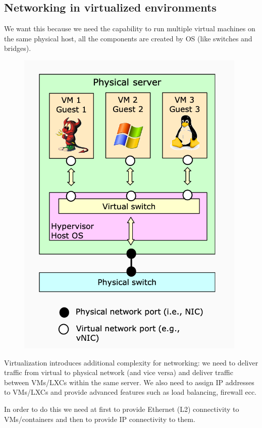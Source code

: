     \subsection{Networking in virtualized environments}
    We want this because we need the capability to run multiple virtual machines on the same physical host, all the components are created by OS (like switches and bridges).
    \begin{figure}[h!]
        \centering
        \includegraphics[scale=0.25]{images/virtualnet.png}
    \end{figure}    
    Virtualization introduces additional complexity for networking: we need to deliver traffic from virtual to physical network (and vice versa) and deliver traffic between VMs/LXCs within the same server. We also need to assign IP addresses to VMs/LXCs and provide advanced features such as load balancing, firewall ecc.
    
    In order to do this we need at first to provide Ethernet (L2) connectivity to VMs/containers and then to provide IP connectivity to them.
    
